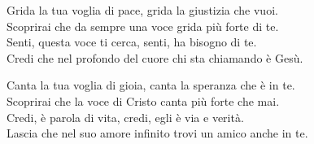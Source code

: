 
\strofa Grida la tua voglia di pace, grida la giustizia che vuoi.\\
Scoprirai che da sempre una voce grida più forte di te.\\
Senti, questa voce ti cerca, senti, ha bisogno di te.\\
Credi che nel profondo del cuore chi sta chiamando è Gesù.

\spazio


\spazio

\strofa Canta la tua voglia di gioia, canta la speranza che è in te.\\
Scoprirai che la voce di Cristo canta più forte che mai.\\
Credi, è parola di vita, credi, egli è via e verità.\\
Lascia che nel suo amore infinito trovi un amico anche in te.

\spazio

